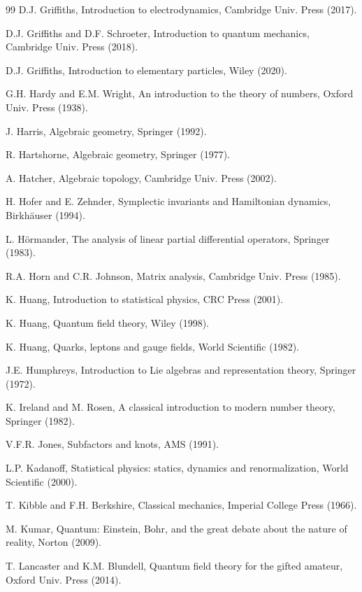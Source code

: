 \documentclass[12pt]{amsbook}
\begin{document}
\begin{thebibliography}{99}
D.J. Griffiths, Introduction to electrodynamics, Cambridge Univ. Press (2017).

D.J. Griffiths and D.F. Schroeter, Introduction to quantum mechanics, Cambridge Univ. Press (2018).

D.J. Griffiths, Introduction to elementary particles, Wiley (2020).

G.H. Hardy and E.M. Wright, An introduction to the theory of numbers, Oxford Univ. Press (1938).

J. Harris, Algebraic geometry, Springer (1992).

R. Hartshorne, Algebraic geometry, Springer (1977).

A. Hatcher, Algebraic topology, Cambridge Univ. Press (2002).

H. Hofer and E. Zehnder, Symplectic invariants and Hamiltonian dynamics, Birkh\"auser (1994).

L. H\"ormander, The analysis of linear partial differential operators, Springer (1983).

R.A. Horn and C.R. Johnson, Matrix analysis, Cambridge Univ. Press (1985).

K. Huang, Introduction to statistical physics, CRC Press (2001).

K. Huang, Quantum field theory, Wiley (1998).

K. Huang, Quarks, leptons and gauge fields, World Scientific (1982).

J.E. Humphreys, Introduction to Lie algebras and representation theory, Springer (1972).

K. Ireland and M. Rosen, A classical introduction to modern number theory, Springer (1982).

V.F.R. Jones, Subfactors and knots, AMS (1991).

L.P. Kadanoff, Statistical physics: statics, dynamics and renormalization, World Scientific (2000).

T. Kibble and F.H. Berkshire, Classical mechanics, Imperial College Press (1966).

M. Kumar, Quantum: Einstein, Bohr, and the great debate about the nature of reality, Norton (2009). 

T. Lancaster and K.M. Blundell, Quantum field theory for the gifted amateur, Oxford Univ. Press (2014).


\end{thebibliography}
\end{document}
